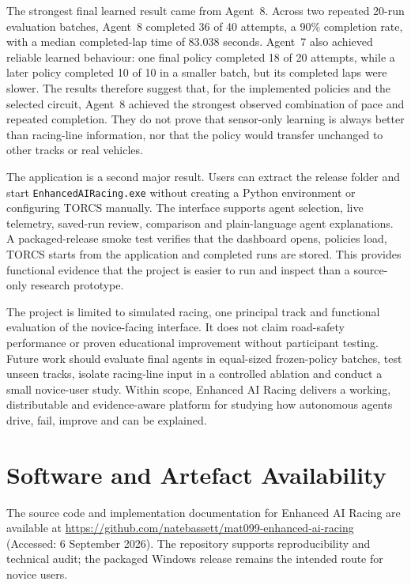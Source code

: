 \documentclass[12pt,a4paper]{article}
\numberwithin{figure}{section}
\numberwithin{table}{section}
\begin{document}
The strongest final learned result came from Agent~8. Across two repeated 20-run evaluation batches, Agent~8 completed 36 of 40 attempts, a 90\% completion rate, with a median completed-lap time of 83.038 seconds. Agent~7 also achieved reliable learned behaviour: one final policy completed 18 of 20 attempts, while a later policy completed 10 of 10 in a smaller batch, but its completed laps were slower. The results therefore suggest that, for the implemented policies and the selected circuit, Agent~8 achieved the strongest observed combination of pace and repeated completion. They do not prove that sensor-only learning is always better than racing-line information, nor that the policy would transfer unchanged to other tracks or real vehicles.

The application is a second major result. Users can extract the release folder and start \texttt{EnhancedAIRacing.exe} without creating a Python environment or configuring TORCS manually. The interface supports agent selection, live telemetry, saved-run review, comparison and plain-language agent explanations. A packaged-release smoke test verifies that the dashboard opens, policies load, TORCS starts from the application and completed runs are stored. This provides functional evidence that the project is easier to run and inspect than a source-only research prototype.

The project is limited to simulated racing, one principal track and functional evaluation of the novice-facing interface. It does not claim road-safety performance or proven educational improvement without participant testing. Future work should evaluate final agents in equal-sized frozen-policy batches, test unseen tracks, isolate racing-line input in a controlled ablation and conduct a small novice-user study. Within scope, Enhanced AI Racing delivers a working, distributable and evidence-aware platform for studying how autonomous agents drive, fail, improve and can be explained.

\section*{Software and Artefact Availability}

The source code and implementation documentation for Enhanced AI Racing are available at \url{https://github.com/natebassett/mat099-enhanced-ai-racing} (Accessed: 6 September 2026). The repository supports reproducibility and technical audit; the packaged Windows release remains the intended route for novice users.

\tableofcontents
\listoffigures
\listoftables

\clearpage
{}













\printbibliography[heading=bibintoc,title={References}]
\end{document}
